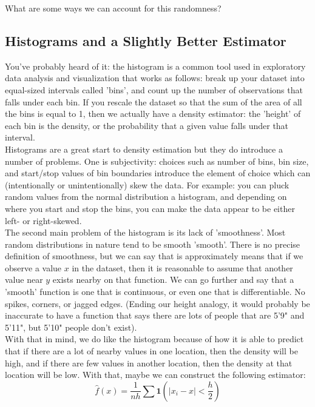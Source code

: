 \documentclass[12pt]{article}
\begin{document}
What are some ways we can account for this randomness?
\subsection{Histograms and a Slightly Better Estimator}
You've probably heard of it: the histogram is a common tool used in exploratory data analysis and visualization that works as follows: break up your dataset into equal-sized intervals called 'bins', and count up the number of observations that falls under each bin. If you rescale the dataset so that the sum of the area of all the bins is equal to 1, then we actually have a density estimator: the 'height' of each bin is the density, or the probability that a given value falls under that interval. \\

Histograms are a great start to density estimation but they do introduce a number of problems. One is subjectivity: choices such as number of bins, bin size, and start/stop values of bin boundaries introduce the element of choice which can (intentionally or unintentionally) skew the data. For example: you can pluck random values from the normal distribution a histogram, and depending on where you start and stop the bins, you can make the data appear to be either left- or right-skewed. \\

The second main problem of the histogram is its lack of 'smoothness'. Most random distributions in nature tend to be smooth 'smooth'. There is no precise definition of smoothness, but we can say that is approximately means that if we observe a value $x$ in the dataset, then it is reasonable to assume that another value near $y$ exists nearby on that function. We can go further and say that a 'smooth' function is one that is continuous, or even one that is differentiable. No spikes, corners, or jagged edges. (Ending our height analogy, it would probably be inaccurate to have a function that says there are lots of people that are 5'9" and 5'11", but 5'10" people don't exist). \\

With that in mind, we do like the histogram because of how it is able to predict that if there are a lot of nearby values in one location, then the density will be high, and if there are few values in another location, then the density at that location will be low. With that, maybe we can construct the following estimator: 
$$ \hat{f}(x) = \frac{1}{nh} \sum \mathbf{1} (|x_i - x| < \frac{h}{2}) $$
\end{document}
